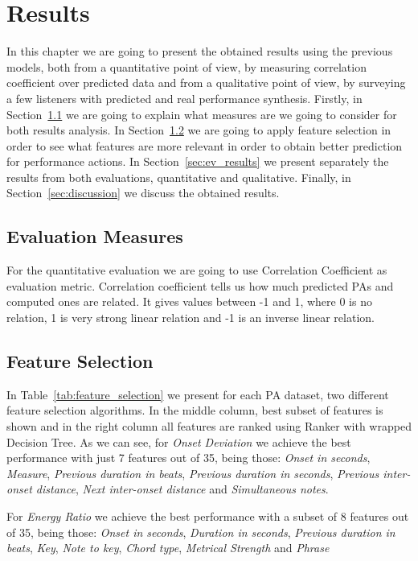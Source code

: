 \chapter{Results}
\label{chap:results}
In this chapter we are going to present the obtained results using the previous models, both from a quantitative point of view, by measuring correlation coefficient over predicted data and from a qualitative point of view, by surveying a few listeners with predicted and real performance synthesis. Firstly, in Section~\ref{sec:ev_measures} we are going to explain what measures are we going to consider for both results analysis. In Section~\ref{sec:features} we are going to apply feature selection in order to see what features are more relevant in order to obtain better prediction for performance actions. In Section~\ref{sec:ev_results} we present separately the results from both evaluations, quantitative and qualitative. Finally, in Section~\ref{sec:discussion} we discuss the obtained results.

\section{Evaluation Measures}
\label{sec:ev_measures}
For the quantitative evaluation we are going to use Correlation Coefficient as evaluation metric. Correlation coefficient tells us how much predicted PAs and computed ones are related. It gives values between -1 and 1, where 0 is no relation, 1 is very strong linear relation and -1 is an inverse linear relation.

\section{Feature Selection}
\label{sec:features}



In Table~\ref{tab:feature_selection} we present for each PA dataset, two different feature selection algorithms. In the middle column, best subset of features is shown and in the right column all features are ranked using Ranker with wrapped Decision Tree. As we can see, for \textit{Onset Deviation} we achieve the best performance with just 7 features out of 35, being those: \textit{Onset in seconds}, \textit{Measure}, \textit{Previous duration in beats}, \textit{Previous duration in seconds}, \textit{Previous inter-onset distance}, \textit{Next inter-onset distance} and \textit{Simultaneous notes}.

For \textit{Energy Ratio} we achieve the best performance with a subset of 8 features out of 35, being those: \textit{Onset in seconds}, \textit{Duration in seconds}, \textit{Previous duration in beats}, \textit{Key}, \textit{Note to key}, \textit{Chord type}, \textit{Metrical Strength} and \textit{Phrase}


